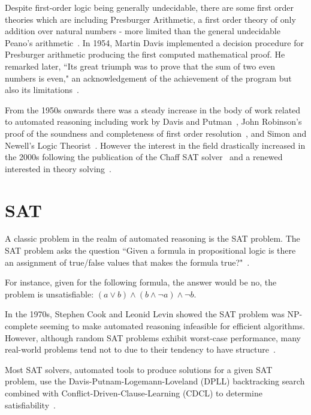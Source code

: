 \documentclass[]{final_report}
\begin{document}
Despite first-order logic being generally undecidable, there are some first order theories which are including Presburger Arithmetic, a first order theory of only addition over natural numbers - more limited than the general undecidable Peano's arithmetic~\cite{automatedreasoningbooklet2004}. In 1954, Martin Davis implemented a decision procedure for Presburger arithmetic producing the first computed mathematical proof. He remarked later, ``Its great triumph was to prove that the sum of two even numbers is even," an acknowledgement of the achievement of the program but also its limitations~\cite{excapebarrettriseofsmt, automatedreasoningbooklet2004}.

From the 1950s onwards there was a steady increase in the body of work related to automated reasoning including work by Davis and Putman~\cite{Davis:1960:CPQ:321033.321034,Davis:1962:MPT:368273.368557}, John Robinson's proof of the soundness and completeness of first order resolution~\cite{robinson1965machine}, and Simon and Newell's Logic Theorist~\cite{newell1956logic}. However the interest in the field drastically increased in the 2000s following the publication of the Chaff SAT solver~\cite{moskewicz2001chaff} and a renewed interested in theory solving~\cite{excapebarrettriseofsmt}.

\section{SAT}
A classic problem in the realm of automated reasoning is the SAT problem. The SAT problem asks the question ``Given a formula in propositional logic is there an assignment of true/false values that makes the formula true?"~\cite{smtwheredowegofromhere}.

For instance, given for the following formula, the answer would be no, the problem is unsatisfiable: $(a \lor b) \land (b \land \lnot a) \land \lnot b $.

In the 1970s, Stephen Cook and Leonid Levin showed the SAT problem was NP-complete seeming to make automated reasoning infeasible for efficient algorithms. However, although random SAT problems exhibit worst-case performance, many real-world problems tend not to due to their tendency to have structure~\cite{smtwheredowegofromhere}.

Most SAT solvers, automated tools to produce solutions for a given SAT problem, use the Davis-Putnam-Logemann-Loveland (DPLL) backtracking search combined with Conflict-Driven-Clause-Learning (CDCL) to determine satisfiability~\cite{zhang2001efficient, gomes2008satisfiability}.
\end{document}
